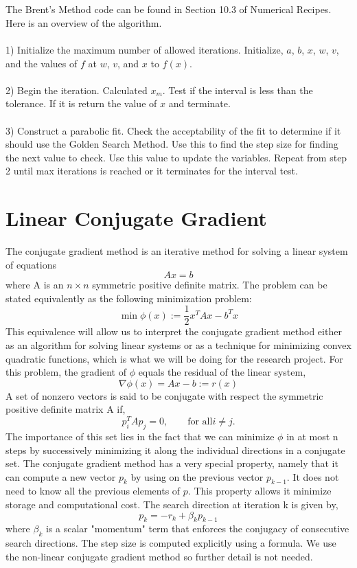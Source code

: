 \documentclass[12pt]{article}
\begin{document}
\begin{flushleft}
\\~\\
\qquad The Brent's Method code can be found in Section 10.3 of Numerical Recipes. Here is an overview of the algorithm. 
\\~\\
1) Initialize the maximum number of allowed iterations. Initialize, $a$, $b$, $x$, $w$, $v$, and the values of $f$ at $w$, $v$, and $x$ to $f(x)$.
\\~\\
2) Begin the iteration. Calculated $x_m$. Test if the interval is less than the tolerance. If it is return the value of $x$ and terminate.
\\~\\
3) Construct a parabolic fit. Check the acceptability of the fit to determine if it should use the Golden Search Method. Use this to find the step size for finding the next value to check. Use this value to update the variables. Repeat from step 2 until max iterations is reached or it terminates for the interval test.

\section{Linear Conjugate Gradient}

The conjugate gradient method is an iterative method for solving a linear system of equations
$$Ax = b$$
where A is an $n\times n$ symmetric positive definite matrix. The problem can be stated equivalently as the following minimization problem:
$$\min \phi(x):=\frac{1}{2}x^TAx -b^Tx$$
\qquad This equivalence will allow us to interpret the conjugate gradient method either as an algorithm for solving linear systems or as a technique for minimizing convex quadratic functions, which is what we will be doing for the research project. For this problem, the gradient of $\phi$ equals the residual of the linear system,
$$\nabla\phi(x) = Ax-b := r(x)$$
A set of nonzero vectors is said to be conjugate with respect the symmetric positive definite matrix A if,
$$p_i^TAp_j = 0, \qquad \text{for all} i\neq j.$$
\qquad The importance of this set lies in the fact that we can minimize $\phi$ in at most n steps by successively minimizing it along the individual directions in a conjugate set. The conjugate gradient method has a very special property, namely that it can compute a new vector $p_k$ by using on the previous vector $p_{k-1}$. It does not need to know all the previous elements of $p$. This property allows it minimize storage and computational cost. The search direction at iteration k is given by,
$$p_k = -r_k + \beta_kp_{k-1}$$
where $\beta_k$ is a scalar "momentum" term that enforces the conjugacy of consecutive search directions. The step size is computed explicitly using a formula. We use the non-linear conjugate gradient method so further detail is not needed.


\end{flushleft}
\end{document}
